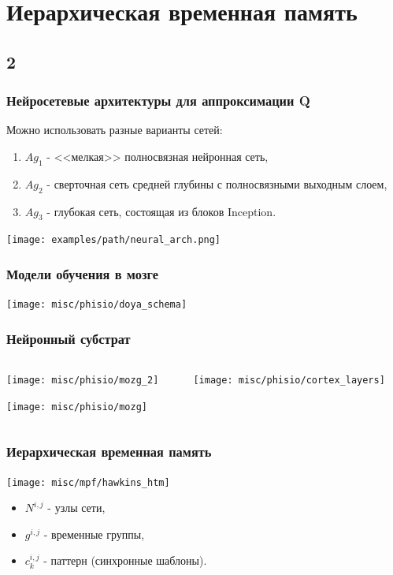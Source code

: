 \documentclass[default]{beamer}
\begin{document}
	\section{Иерархическая временная память}
	\subsection{2}

	\begin{frame}
		\frametitle{Нейросетевые архитектуры для аппроксимации Q}
		Можно использовать разные варианты сетей:
		\begin{enumerate}
			\item $Ag_1$ - <<мелкая>> полносвязная нейронная сеть,
			\item $Ag_2$ - сверточная сеть средней глубины с полносвязными выходным слоем,
			\item $Ag_3$ - глубокая сеть, состоящая из блоков Inception.
		\end{enumerate}
		\centering
		\texttt{[image: examples/path/neural\_arch.png]}
	\end{frame}
	
	\begin{frame}
		\frametitle{Модели обучения в мозге}
		
		\begin{center}
			\texttt{[image: misc/phisio/doya\_schema]}
		\end{center}

	\end{frame}	
	
	\begin{frame}
		\frametitle{Нейронный субстрат}
		
		\begin{columns}
		\begin{column}{0.35\textwidth}
			\texttt{[image: misc/phisio/mozg\_2]}
			\par\bigskip
			\hspace{-7mm}\texttt{[image: misc/phisio/mozg]}
		\end{column}
		\begin{column}{0.65\textwidth}
			\texttt{[image: misc/phisio/cortex\_layers]}
		\end{column}
		\end{columns}

	\end{frame}
		
		
	\begin{frame}
		\frametitle{Иерархическая временная память}
		
		\begin{center}
		\texttt{[image: misc/mpf/hawkins\_htm]}
		\end{center}
		\par\bigskip
		\begin{itemize}
			\item $N^{i,j}$ - узлы сети,
			\item $g^{i,j}$ - временные группы,
			\item $c^{i,j}_k$ - паттерн (синхронные шаблоны).
		\end{itemize}
				
	\end{frame}
		
\end{document}
